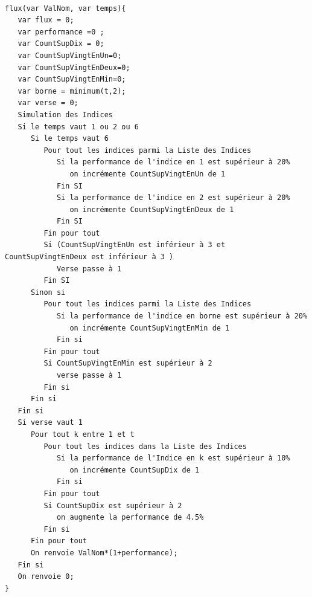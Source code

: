 \documentclass[french,12pt,a4paper]{article}
\begin{document}
\begin{verbatim}

flux(var ValNom, var temps){
   var flux = 0;
   var performance =0 ;
   var CountSupDix = 0;
   var CountSupVingtEnUn=0;
   var CountSupVingtEnDeux=0;
   var CountSupVingtEnMin=0;
   var borne = minimum(t,2);
   var verse = 0;
   Simulation des Indices
   Si le temps vaut 1 ou 2 ou 6
      Si le temps vaut 6
         Pour tout les indices parmi la Liste des Indices
            Si la performance de l'indice en 1 est supérieur à 20%
               on incrémente CountSupVingtEnUn de 1
            Fin SI
            Si la performance de l'indice en 2 est supérieur à 20%
               on incrémente CountSupVingtEnDeux de 1
            Fin SI
         Fin pour tout
         Si (CountSupVingtEnUn est inférieur à 3 et CountSupVingtEnDeux est inférieur à 3 )
            Verse passe à 1
         Fin SI
      Sinon si
         Pour tout les indices parmi la Liste des Indices
            Si la performance de l'indice en borne est supérieur à 20%
               on incrémente CountSupVingtEnMin de 1 
            Fin si
         Fin pour tout
         Si CountSupVingtEnMin est supérieur à 2
            verse passe à 1
         Fin si
      Fin si
   Fin si
   Si verse vaut 1
      Pour tout k entre 1 et t
         Pour tout les indices dans la Liste des Indices
            Si la performance de l'Indice en k est supérieur à 10%
               on incrémente CountSupDix de 1
            Fin si
         Fin pour tout
         Si CountSupDix est supérieur à 2
            on augmente la performance de 4.5%
         Fin si
      Fin pour tout
      On renvoie ValNom*(1+performance);
   Fin si
   On renvoie 0;
}
\end{verbatim}
\end{document}
